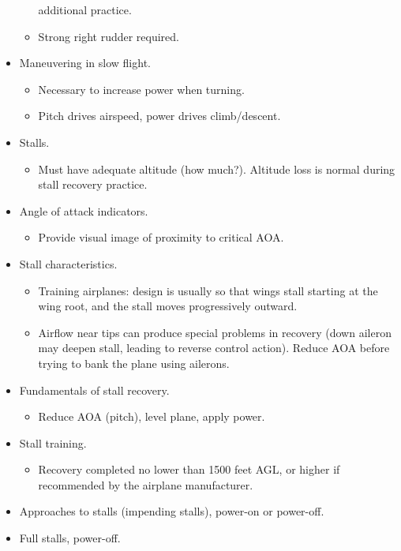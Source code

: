 \documentclass[letterpaper,10pt,titlepage]{article}
\begin{document}
\begin{itemize}
\begin{itemize}
	        additional practice.
	  \item Strong right rudder required.
	  \end{itemize}
\item Maneuvering in slow flight.
	  \begin{itemize}
	  \item Necessary to increase power when turning.
      \item Pitch drives airspeed, power drives climb/descent.
	  \end{itemize}
\item Stalls.
	  \begin{itemize}
	  \item Must have adequate altitude (how much?).  Altitude loss is normal during stall recovery
	        practice.
	  \end{itemize}
\item Angle of attack indicators.
	  \begin{itemize}
	  \item Provide visual image of proximity to critical AOA.
	  \end{itemize}
\item Stall characteristics.
	  \begin{itemize}
	  \item Training airplanes: design is usually so that wings stall starting at the wing root,
	        and the stall moves
	        progressively outward.
	  \item Airflow near tips can produce special problems in recovery (down aileron may deepen stall, leading
	        to reverse control action).  Reduce AOA before trying
	        to bank the plane using ailerons.
	  \end{itemize}
\item Fundamentals of stall recovery.
	  \begin{itemize}
	  \item Reduce AOA (pitch), level plane, apply power.
	  \end{itemize}
\item Stall training.
	  \begin{itemize}
	  \item Recovery completed no lower than 1500 feet AGL, or higher if recommended by the airplane
	        manufacturer.
	  \end{itemize}
\item Approaches to stalls (impending stalls), power-on or power-off.
\item Full stalls, power-off.

\end{itemize}
\end{document}
